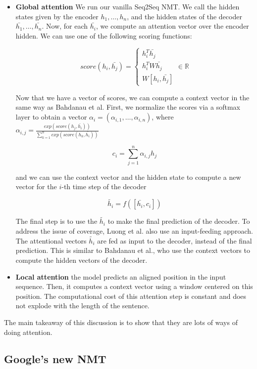 \documentclass{tufte-handout}
\begin{document}
\begin{itemize}
\item \textbf{Global attention} We run our vanilla Seq2Seq NMT. We call the hidden states given by the encoder $ h_1, \ldots, h_n $, and the hidden states of the decoder $ \bar{h_1}, \ldots, \bar{h_n}$. Now, for each $ \bar{h_i}$, we compute an attention vector over the encoder hidden. We can use one of the following scoring functions:

$$ score(h_i, \bar{h_j}) = \begin{cases}
h_i^T \bar{h_j}\\
h_i^T W \bar{h_j}\\
W [h_i, \bar{h_j}]
\end{cases} \in \mathbb{R} $$ 

Now that we have a vector of scores, we can compute a context vector in the same way as Bahdanau et al. First, we normalize the scores via a softmax layer to obtain a vector $ \alpha_i = (\alpha_{i, 1}, \ldots , \alpha_{i,n}) $, where $ \alpha_{i,j} = \frac{exp(score(h_j, \bar{h_i}))}{\sum_{k=1}^n exp(score(h_k, \bar{h_i}))} $

$$ c_i = \sum_{j=1}^n \alpha_{i, j} h_j$$

and we can use the context vector and the hidden state to compute a new vector for the $i$-th time step of the decoder 

$$ \tilde{h_i} = f([\bar{h_i}, c_i]) $$

The final step is to use the $ \tilde{h_i} $ to make the final prediction of the decoder. To address the issue of coverage, Luong et al. also use an input-feeding approach. The attentional vectors $ \tilde{h_i} $ are fed as input to the decoder, instead of the final prediction. This is similar to Bahdanau et al., who use the context vectors to compute the hidden vectors of the decoder.

\item \textbf{Local attention} the model predicts an aligned position in the input sequence. Then, it computes a context vector using a window centered on this position. The computational cost of this attention step is constant and does not explode with the length of the sentence.
\end{itemize}

The main takeaway of this discussion is to show that they are lots of ways of doing attention.


\subsection{Google's new NMT}
\end{document}
